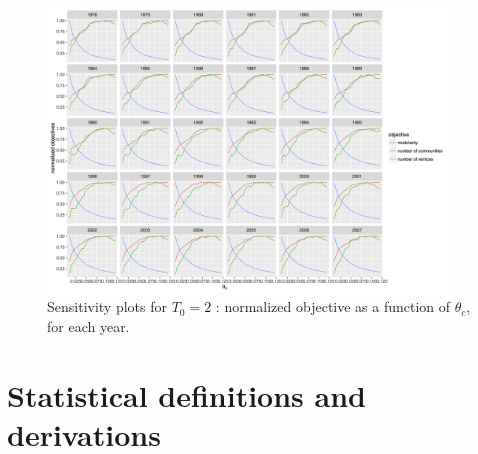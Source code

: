 \documentclass[article]{article}%
\begin{document}
\begin{figure}
	\centering
	\includegraphics[width=0.95\textwidth,height=\textwidth,angle=90]{figures/normalizedObjs-dispth_window3_eth4_1e-5.png}
	\caption{Sensitivity plots for $T_0 = 2$ : normalized objective as a function of $\theta_c$, for each year.}
	\label{fig:sensitivity-window3-3}
\end{figure}

\section{Statistical definitions and derivations} \label{app:stat}
\end{document}
